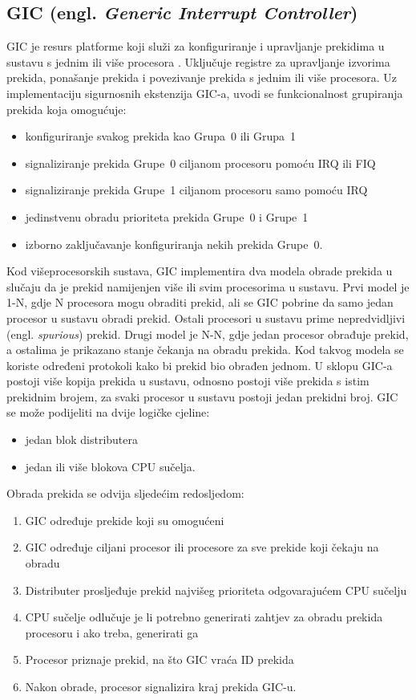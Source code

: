 \documentclass[times, utf8, diplomski, numeric]{fer}
\begin{document}
\subsection{GIC (engl. \textit{Generic Interrupt Controller})}
GIC je resurs platforme koji služi za konfiguriranje i upravljanje prekidima u sustavu s jednim ili više procesora
\cite{gic}.
Uključuje registre za upravljanje izvorima prekida, ponašanje prekida i povezivanje prekida s jednim ili više
procesora. Uz implementaciju sigurnosnih ekstenzija GIC-a, uvodi se funkcionalnost grupiranja prekida koja omogućuje:
\begin{itemize}
  \item{konfiguriranje svakog prekida kao Grupa~0 ili Grupa~1}
  \item{signaliziranje prekida Grupe~0 ciljanom procesoru pomoću IRQ ili FIQ}
  \item{signaliziranje prekida Grupe~1 ciljanom procesoru samo pomoću IRQ}
  \item{jedinstvenu obradu prioriteta prekida Grupe~0 i Grupe~1}
  \item{izborno zaključavanje konfiguriranja nekih prekida Grupe~0.}
\end{itemize}
Kod višeprocesorskih sustava, GIC implementira dva modela obrade prekida u slučaju da je prekid namijenjen više
ili svim procesorima u sustavu. Prvi model je 1-N, gdje N procesora mogu obraditi prekid, ali se GIC pobrine da samo
jedan procesor u sustavu obradi prekid. Ostali procesori u sustavu prime nepredvidljivi (engl. \textit{spurious}) prekid.
Drugi model je N-N, gdje jedan procesor obrađuje prekid, a ostalima je prikazano stanje čekanja na obradu prekida.
Kod takvog modela se koriste određeni protokoli kako bi prekid bio obrađen jednom. U sklopu GIC-a postoji više kopija
prekida u sustavu, odnosno postoji više prekida s istim prekidnim brojem, za svaki procesor u sustavu postoji jedan prekidni
broj. GIC se može podijeliti na dvije logičke cjeline:
\begin{itemize}
  \item{jedan blok distributera}
  \item{jedan ili više blokova CPU sučelja.}
\end{itemize}
Obrada prekida se odvija sljedećim redosljedom:
\begin{enumerate}
  \item{GIC određuje prekide koji su omogućeni}
  \item{GIC određuje ciljani procesor ili procesore za sve prekide koji čekaju na obradu}
  \item{Distributer prosljeđuje prekid najvišeg prioriteta odgovarajućem CPU sučelju}
  \item{CPU sučelje odlučuje je li potrebno generirati zahtjev za obradu prekida procesoru i ako treba, generirati ga}
  \item{Procesor priznaje prekid, na što GIC vraća ID prekida}
  \item{Nakon obrade, procesor signalizira kraj prekida GIC-u.}
\end{enumerate}
\end{document}
